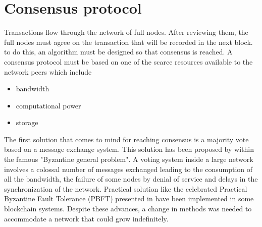 \chapter{Consensus protocol}\label{chap:consensus}
Transactions flow through the network of full nodes. After reviewing them, the full nodes must agree on the transaction that will be recorded in the next block. to do this, an algorithm must be designed so that consensus is reached.
A consensus protocol must be based on one of the scarce resources available to the network peers which include
\begin{itemize}
	\item bandwidth
	\item computational power
	\item storage 
\end{itemize}
The first solution that comes to mind for reaching consensus is a majority vote based on a message exchange system. This solution has been proposed by \citet{lamport1982the} within the famous "Byzantine general problem". A voting system inside a large network involves a colossal number of messages exchanged leading to the consumption of all the bandwidth, the failure of some nodes by denial of service and delays in the synchronization of the network. Practical solution like the celebrated Practical Byzantine Fault Tolerance (PBFT) presented in \citet{10.5555/296806.296824} have been implemented in some blockchain systems. Despite these advances, a change in methods was needed to accommodate a network that could grow indefinitely.\\


